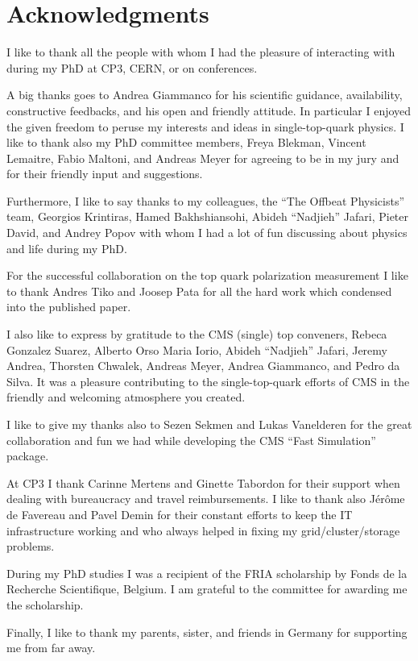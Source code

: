 \chapter*{Acknowledgments}

I like to thank all the people with whom I had the pleasure of interacting with during my PhD at CP3, CERN, or on conferences.

A big thanks goes to Andrea Giammanco for his scientific guidance, availability, constructive feedbacks, and his open and friendly attitude. In particular I enjoyed the given freedom to peruse my interests and ideas in single-top-quark physics. I like to thank also my PhD committee members, Freya Blekman, Vincent Lemaitre, Fabio Maltoni, and Andreas Meyer for agreeing to be in my jury and for their friendly input and suggestions.

Furthermore, I like to say thanks to my colleagues, the ``The Offbeat Physicists'' team, Georgios Krintiras, Hamed Bakhshiansohi, Abideh ``Nadjieh'' Jafari, Pieter David, and Andrey Popov with whom I had a lot of fun discussing about physics and life during my PhD.

For the successful collaboration on the top quark polarization measurement I like to thank Andres Tiko and Joosep Pata for all the hard work which condensed into the published paper.

I also like to express by gratitude to the CMS (single) top conveners, Rebeca Gonzalez Suarez, Alberto Orso Maria Iorio, Abideh ``Nadjieh'' Jafari, Jeremy Andrea, Thorsten Chwalek, Andreas Meyer, Andrea Giammanco, and Pedro da Silva. It was a pleasure contributing to the single-top-quark efforts of CMS in the friendly and welcoming atmosphere you created.

I like to give my thanks also to Sezen Sekmen and Lukas Vanelderen for the great collaboration and fun we had while developing the CMS ``Fast Simulation'' package.

At CP3 I thank Carinne Mertens and Ginette Tabordon for their support when dealing with bureaucracy and travel reimbursements. I like to thank also J\'er\^ome de Favereau and Pavel Demin for their constant efforts to keep the IT infrastructure working and who always helped in fixing my grid/cluster/storage problems.

During my PhD studies I was a recipient of the FRIA scholarship by Fonds de la Recherche Scientifique, Belgium. I am grateful to the committee for awarding me the scholarship.

Finally, I like to thank my parents, sister, and friends in Germany for supporting me from far away.
